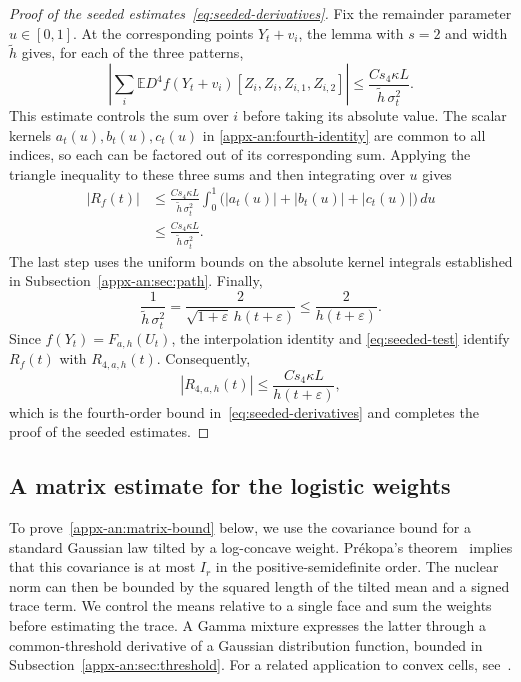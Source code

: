 \documentclass[11pt,letterpaper]{article}
\theoremstyle{remark}
\newcommand{\E}{\mathbb E}
\newcommand{\dd}{\,d}
\begin{document}
\begin{proof}[Proof of the seeded estimates~\eqref{eq:seeded-derivatives}]
Fix the remainder parameter $u\in[0,1]$. At the corresponding
points $Y_t+v_i$, the lemma with $s=2$ and width
$\widetilde h$ gives, for each of the three patterns,
\[
 \left|\sum_i\E D^4f(Y_t+v_i)
                [Z_i,Z_i,Z_{i,1},Z_{i,2}]\right|
 \le\frac{Cs_4\kappa L}{\widetilde h\,\sigma_t^2}.
\]
This estimate controls the sum over $i$ before taking its
absolute value. The scalar kernels $a_t(u),b_t(u),c_t(u)$ in
\eqref{appx-an:fourth-identity} are common to all indices, so
each can be factored out of its corresponding sum. Applying
the triangle inequality to these three sums and then integrating
over $u$ gives
\[
 \begin{aligned}
 |R_f(t)|
 &\le\frac{Cs_4\kappa L}{\widetilde h\,\sigma_t^2}
       \int_0^1\bigl(|a_t(u)|+|b_t(u)|+|c_t(u)|\bigr)\dd u\\
 &\le\frac{Cs_4\kappa L}{\widetilde h\,\sigma_t^2}.
 \end{aligned}
\]
The last step uses the uniform bounds on the absolute kernel
integrals established in Subsection~\ref{appx-an:sec:path}.
Finally,
\[
 \frac1{\widetilde h\,\sigma_t^2}
 =\frac{2}{\sqrt{1+\varepsilon}\,h(t+\varepsilon)}
 \le\frac{2}{h(t+\varepsilon)}.
\]
Since $f(Y_t)=F_{a,h}(U_t)$, the interpolation identity and
\eqref{eq:seeded-test} identify $R_f(t)$ with
$R_{4,a,h}(t)$. Consequently,
\[
 |R_{4,a,h}(t)|\le\frac{Cs_4\kappa L}{h(t+\varepsilon)},
\]
which is the fourth-order bound in~\eqref{eq:seeded-derivatives}
and completes the proof of the seeded estimates.
\end{proof}


\subsection{A matrix estimate for the logistic weights}
\label{appx-an:sec:matrix}

{To prove~\eqref{appx-an:matrix-bound} below, we use the covariance bound for}
a standard Gaussian law tilted by a log-concave weight. Pr\'ekopa's
theorem~\cite[Theorem~6]{Prekopa1973} implies that this covariance is
at most \(I_r\) in the positive-semidefinite order. The nuclear norm
can then be bounded by the squared length of the tilted mean and a
signed trace term. We control the means relative to a single face and sum the
weights before estimating the trace. A Gamma mixture expresses the
latter through a common-threshold derivative of a Gaussian distribution
function, bounded in Subsection~\ref{appx-an:sec:threshold}.
For a related application to convex cells,
see~\cite[Lemma~12]{GaoZhang}.
\end{document}
